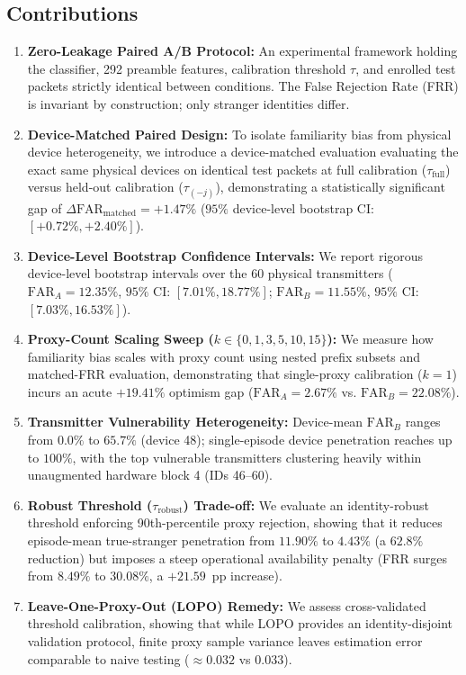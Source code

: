 \documentclass[conference]{IEEEtran}
\begin{document}
\subsection{Contributions}
\begin{enumerate}
    \item \textbf{Zero-Leakage Paired A/B Protocol:} An experimental framework holding the classifier, 292 preamble features, calibration threshold $\tau$, and enrolled test packets strictly identical between conditions. The False Rejection Rate (FRR) is invariant by construction; only stranger identities differ.
    \item \textbf{Device-Matched Paired Design:} To isolate familiarity bias from physical device heterogeneity, we introduce a device-matched evaluation evaluating the exact same physical devices on identical test packets at full calibration ($\tau_{\text{full}}$) versus held-out calibration ($\tau_{(-j)}$), demonstrating a statistically significant gap of $\Delta\text{FAR}_{\text{matched}} = +1.47\%$ ($95\%$ device-level bootstrap CI: $[+0.72\%, +2.40\%]$).
    \item \textbf{Device-Level Bootstrap Confidence Intervals:} We report rigorous device-level bootstrap intervals over the 60 physical transmitters ($\text{FAR}_A = 12.35\%$, $95\%$ CI: $[7.01\%, 18.77\%]$; $\text{FAR}_B = 11.55\%$, $95\%$ CI: $[7.03\%, 16.53\%]$).
    \item \textbf{Proxy-Count Scaling Sweep ($k \in \{0, 1, 3, 5, 10, 15\}$):} We measure how familiarity bias scales with proxy count using nested prefix subsets and matched-FRR evaluation, demonstrating that single-proxy calibration ($k=1$) incurs an acute $+19.41\%$ optimism gap ($\text{FAR}_A = 2.67\%$ vs. $\text{FAR}_B = 22.08\%$).
    \item \textbf{Transmitter Vulnerability Heterogeneity:} Device-mean $\text{FAR}_B$ ranges from $0.0\%$ to $65.7\%$ (device 48); single-episode device penetration reaches up to $100\%$, with the top vulnerable transmitters clustering heavily within unaugmented hardware block 4 (IDs 46--60).
    \item \textbf{Robust Threshold ($\tau_{\text{robust}}$) Trade-off:} We evaluate an identity-robust threshold enforcing 90th-percentile proxy rejection, showing that it reduces episode-mean true-stranger penetration from $11.90\%$ to $4.43\%$ (a $62.8\%$ reduction) but imposes a steep operational availability penalty (FRR surges from $8.49\%$ to $30.08\%$, a $+21.59$~pp increase).
    \item \textbf{Leave-One-Proxy-Out (LOPO) Remedy:} We assess cross-validated threshold calibration, showing that while LOPO provides an identity-disjoint validation protocol, finite proxy sample variance leaves estimation error comparable to naive testing ($\approx 0.032$ vs $0.033$).
\end{enumerate}
\end{document}
